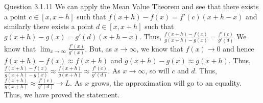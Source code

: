 \documentclass[12pt]{exam}
\begin{document}
\begin{questions}
\question Question 3.1.11 \newline
We can apply the Mean Value Theorem and see that there exists a point $c \in [x, x+h]$ such that $f(x+h)-f(x) = f'(c)(x+h - x)$ and similarly there exists a point $d \in [x, x+h]$ such that $g(x+h)-g(x)=g'(d)(x+h-x)$. Thus, $\frac{f(x+h)-f(x)}{g(x+h)-g(x)} = \frac{f'(c)}{g'(d)}$ We know that $\lim_{x\rightarrow \infty}\frac{f'(x)}{g'(x)}$. But, as $x \rightarrow \infty$, we know that $f(x) \rightarrow 0$ and hence $f(x+h) - f(x) \approx f(x+h)$ and $g(x+h) -g(x) \approx g(x+h)$. Thus, $\frac{f(x+h)-f(x)}{g(x+h)-g(x)} \approx \frac{f(x+h)}{g(x+h)} \approx \frac{f'(c)}{g'(d)}$. As $x\rightarrow \infty$, so will $c$ and $d$. Thus, $\frac{f(x+h)}{g(x+h)} \approx \frac{f'(c)}{g'(d)} \rightarrow L$. As $x$ grows, the approximation will go to an equality. Thus, we have proved the statement. 
\end{questions}
\end{document}
